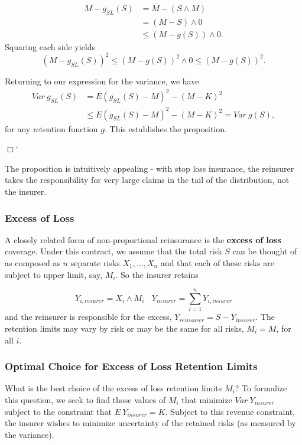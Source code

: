 \documentclass[]{book}
\theoremstyle{definition}
\theoremstyle{definition}
\theoremstyle{definition}
\theoremstyle{remark}
\begin{document}
\[
\begin{array}{ll}
M- g_{SL}(S) &= M-(S \wedge M) \\
&= (M-S) \wedge 0 \\
&\le (M-g(S)) \wedge 0 .
\end{array}
\] Squaring each side yields
\[(M- g_{SL}(S))^2 \le (M-g(S))^2 \wedge 0 \le (M-g(S))^2.\]

Returning to our expression for the variance, we have \[
\begin{array}{ll}
Var~ g_{SL}(S) &= E (g_{SL}(S) -M)^2 -  (M- K)^2 \\
&\le E (g_{SL}(S) -M)^2 -  (M- K)^2 = Var~ g(S) ,
\end{array}
\] for any retention function \(g\). This establishes the proposition.

\(\Box\)`

The proposition is intuitively appealing - with stop loss insurance, the
reinsurer takes the responsibility for very large claims in the tail of
the distribution, not the insurer.

\subsubsection{Excess of Loss}\label{excess-of-loss}

A closely related form of non-proportional reinsurance is the
\textbf{excess of loss} coverage. Under this contract, we assume that
the total risk \(S\) can be thought of as composed as \(n\) separate
risks \(X_1, \ldots, X_n\) and that each of these risks are subject to
upper limit, say, \(M_i\). So the insurer retains

\[
Y_{i,insurer} = X_i \wedge M_i \ \ \ \ Y_{insurer} = \sum_{i=1}^n Y_{i,insurer}
\] and the reinsurer is responsible for the excess,
\(Y_{reinsurer}=S - Y_{insurer}\). The retention limits may vary by risk
or may be the same for all risks, \(M_i =M\), for all \(i\).

\subsubsection{Optimal Choice for Excess of Loss Retention
Limits}\label{optimal-choice-for-excess-of-loss-retention-limits}

What is the best choice of the excess of loss retention limits \(M_i\)?
To formalize this question, we seek to find those values of \(M_i\) that
minimize \(Var ~Y_{insurer}\) subject to the constraint that
\(E ~Y_{insurer} = K.\) Subject to this revenue constraint, the insurer
wishes to minimize uncertainty of the retained risks (as measured by the
variance).
\end{document}

